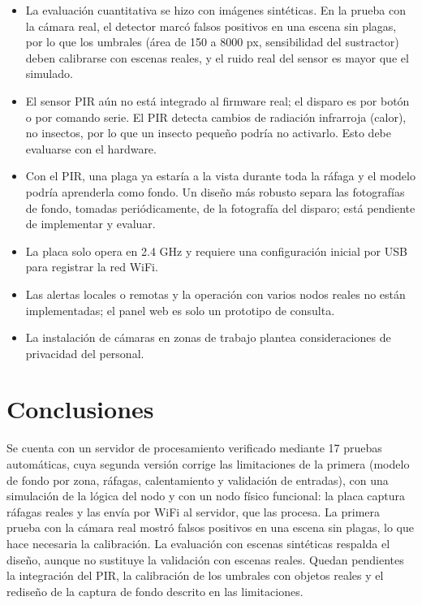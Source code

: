 \documentclass[11pt,a4paper]{article}
\begin{document}
\begin{itemize}
\item La evaluación cuantitativa se hizo con imágenes sintéticas. En la prueba con la cámara real, el detector marcó falsos positivos en una escena sin plagas, por lo que los umbrales (área de 150 a 8000 px, sensibilidad del sustractor) deben calibrarse con escenas reales, y el ruido real del sensor es mayor que el simulado.
\item El sensor PIR aún no está integrado al firmware real; el disparo es por botón o por comando serie. El PIR detecta cambios de radiación infrarroja (calor), no insectos, por lo que un insecto pequeño podría no activarlo. Esto debe evaluarse con el hardware.
\item Con el PIR, una plaga ya estaría a la vista durante toda la ráfaga y el modelo podría aprenderla como fondo. Un diseño más robusto separa las fotografías de fondo, tomadas periódicamente, de la fotografía del disparo; está pendiente de implementar y evaluar.
\item La placa solo opera en 2.4 GHz y requiere una configuración inicial por USB para registrar la red WiFi.
\item Las alertas locales o remotas y la operación con varios nodos reales no están implementadas; el panel web es solo un prototipo de consulta.
\item La instalación de cámaras en zonas de trabajo plantea consideraciones de privacidad del personal.
\end{itemize}

\section{Conclusiones}

Se cuenta con un servidor de procesamiento verificado mediante 17 pruebas automáticas, cuya segunda versión corrige las limitaciones de la primera (modelo de fondo por zona, ráfagas, calentamiento y validación de entradas), con una simulación de la lógica del nodo y con un nodo físico funcional: la placa captura ráfagas reales y las envía por WiFi al servidor, que las procesa. La primera prueba con la cámara real mostró falsos positivos en una escena sin plagas, lo que hace necesaria la calibración. La evaluación con escenas sintéticas respalda el diseño, aunque no sustituye la validación con escenas reales. Quedan pendientes la integración del PIR, la calibración de los umbrales con objetos reales y el rediseño de la captura de fondo descrito en las limitaciones.
\end{document}
